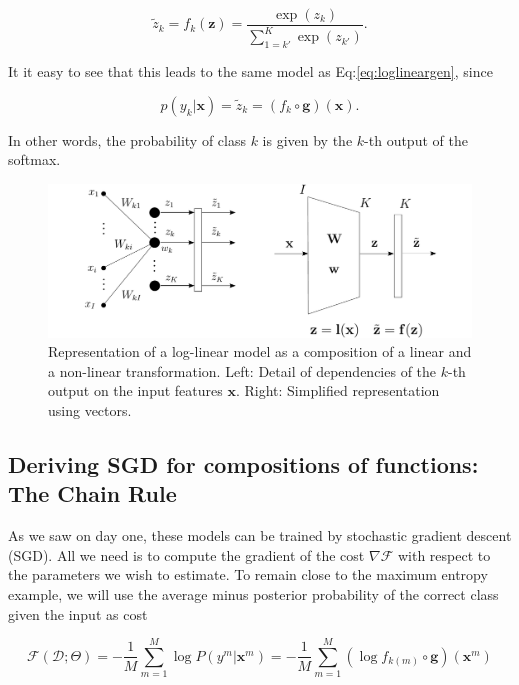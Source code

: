 \begin{equation}
\tilde{z}_k = f_k(\mathbf{z}) = \frac{\exp(z_k)}{\sum_{1=k'}^K \exp(z_{k'})}. 
\label{eq:softmax}
\end{equation}

\noindent It it easy to see that this leads to the same model as Eq:\ref{eq:loglineargen}, since

\begin{equation}
p(y_k|\mathbf{x}) = \tilde{z}_k = (f_k \circ \mathbf{g})(\mathbf{x}). 
\end{equation}

\noindent In other words, the probability of class $k$ is given by the $k$-th output of the softmax.

\begin{figure}
\centering
\includegraphics[scale=0.4]{figs/deep_learning/LayerP.pdf}
\caption{Representation of a log-linear model as a composition of a linear and a non-linear transformation. Left: Detail of dependencies of the $k$-th output on the input features $\mathbf{x}$. Right: Simplified representation using vectors.}
\label{fig:LayerP}
\end{figure}

\subsection{Deriving SGD for compositions of functions: The Chain Rule}

As we saw on day one, these models can be trained by  stochastic gradient descent (SGD). All we need is to compute the gradient  of the cost $\nabla\mathcal{F}$ with respect to the parameters we wish to estimate. To remain close to the maximum entropy example, we will use the average minus posterior probability of the correct class given the input as cost

\begin{equation}
\mathcal{F}(\mathcal{D};\Theta) = -\frac{1}{M}\sum_{m=1}^M \log P(y^m | \mathbf{x}^m) = -\frac{1}{M}\sum_{m=1}^M (\log f_{k(m)} \circ \mathbf{g})(\mathbf{x}^m)
\label{eq:CostLogPos}
\end{equation}
	
